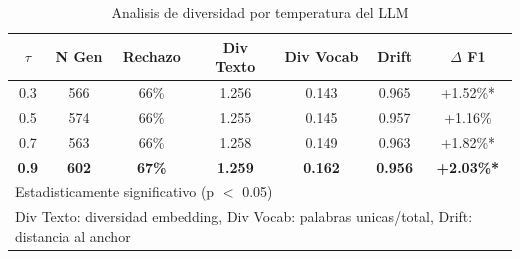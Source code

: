 \begin{table}[h]
\centering
\caption{Analisis de diversidad por temperatura del LLM}
\label{tab:temperature_diversity}
\begin{tabular}{ccccccc}
\hline
$\tau$ & N Gen & Rechazo & Div Texto & Div Vocab & Drift & $\Delta$ F1 \\
\hline
0.3 & 566 & 66\% & 1.256 & 0.143 & 0.965 & +1.52\%* \\
0.5 & 574 & 66\% & 1.255 & 0.145 & 0.957 & +1.16\% \\
0.7 & 563 & 66\% & 1.258 & 0.149 & 0.963 & +1.82\%* \\
\textbf{0.9} & \textbf{602} & \textbf{67\%} & \textbf{1.259} & \textbf{0.162} & \textbf{0.956} & \textbf{+2.03\%*} \\
\hline
\multicolumn{7}{l}{\footnotesize *Estadisticamente significativo (p $<$ 0.05)}\\
\multicolumn{7}{l}{\footnotesize Div Texto: diversidad embedding, Div Vocab: palabras unicas/total, Drift: distancia al anchor}\\
\end{tabular}
\end{table}
